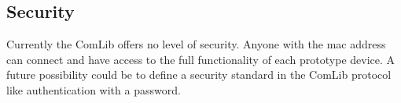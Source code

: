 \subsection{Security}
Currently the ComLib offers no level of security. Anyone with the mac address can connect
and have access to the full functionality of each prototype device. A future possibility could
be to define a security standard in the ComLib protocol like authentication with a password.